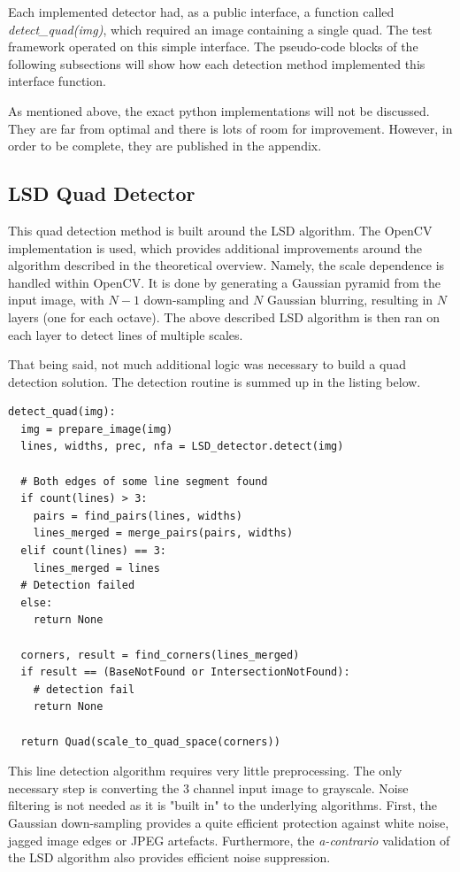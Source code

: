 Each implemented detector had, as a public interface, a function called \textit{detect\_quad(img)}, which required an image containing a single quad.
The test framework operated on this simple interface.
The pseudo-code blocks of the following subsections will show how each detection method implemented this interface function.

As mentioned above, the exact python implementations will not be discussed.
They are far from optimal and there is lots of room for improvement.
However, in order to be complete, they are published in the appendix.

\subsection{LSD Quad Detector}

This quad detection method is built around the LSD algorithm.
The OpenCV implementation is used, which provides additional improvements around the algorithm described in the theoretical overview.
Namely, the scale dependence is handled within OpenCV.
It is done by generating a Gaussian pyramid from the input image, with $N-1$ down-sampling and $N$ Gaussian blurring, resulting in $N$ layers (one for each octave).
The above described LSD algorithm is then ran on each layer to detect lines of multiple scales.

That being said, not much additional logic was necessary to build a quad detection solution.
The detection routine is summed up in the listing below.
\begin{lstlisting}
detect_quad(img):
  img = prepare_image(img)
  lines, widths, prec, nfa = LSD_detector.detect(img)
	
  # Both edges of some line segment found
  if count(lines) > 3:
    pairs = find_pairs(lines, widths)
    lines_merged = merge_pairs(pairs, widths)
  elif count(lines) == 3:
    lines_merged = lines
  # Detection failed
  else:
    return None
	
  corners, result = find_corners(lines_merged)
  if result == (BaseNotFound or IntersectionNotFound):
    # detection fail
    return None
	
  return Quad(scale_to_quad_space(corners))
\end{lstlisting}

This line detection algorithm requires very little preprocessing.
The only necessary step is converting the 3 channel input image to grayscale.
Noise filtering is not needed as it is "built in" to the underlying algorithms.
First, the Gaussian down-sampling provides a quite efficient protection against white noise, jagged image edges or JPEG artefacts.
Furthermore, the \textit{a-contrario} validation of the LSD algorithm also provides efficient noise suppression.

